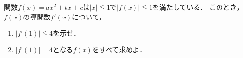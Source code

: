 \documentclass[../../main.tex]{subfiles}
\begin{document}
関数$f(x)=ax^2+bx+c$は$|x|\leqq1$で$|f(x)|\leqq1$を満たしている．
このとき，$f(x)$の導関数$f'(x)$について，
\begin{enumerate}
  \item $|f'(1)|\leqq4$を示せ．
  \item $|f'(1)|=4$となる$f(x)$をすべて求めよ．
\end{enumerate}
\end{document}
